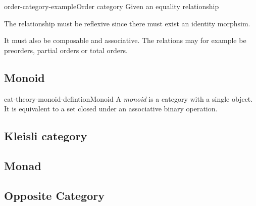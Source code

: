 \documentclass[preview]{standalone}
\begin{document}
\begin{snippetexample}{order-category-example}{Order category}
    Given an equality relationship

    \begin{center}
    \end{center}

    The relationship must be reflexive since there must exist an identity morphsim.

    \begin{center}
    \end{center}

    It must also be composable and associative.
    The relations may for example be preorders, partial orders
    or total orders.
\end{snippetexample}

\subsection{Monoid}

\begin{snippetdefinition}{cat-theory-monoid-defintion}{Monoid}
    A \textit{monoid} is a category with a single object.
    It is equivalent to a set closed under an associative binary operation.
\end{snippetdefinition}

\subsection{Kleisli category}


\subsection{Monad}


\subsection{Opposite Category}
\end{document}
